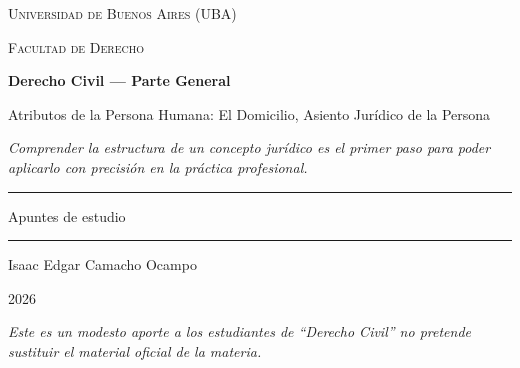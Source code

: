 \documentclass[12pt,oneside]{book}
\newcommand{\universidad}{Universidad de Buenos Aires (UBA)}
\newcommand{\facultad}{Facultad de Derecho}
\newcommand{\materia}{Derecho Civil --- Parte General}
\newcommand{\titulo}{Atributos de la Persona Humana: El Domicilio, Asiento Jurídico de la Persona}
\newcommand{\autor}{Isaac Edgar Camacho Ocampo}
\newcommand{\anio}{2026}
\begin{document}
\begin{titlepage}

\thispagestyle{empty}

\begin{center}

\vspace*{1cm}

{\large \textsc{\universidad}}

\vspace{0.2cm}

{\large \textsc{\facultad}}

\vspace{3cm}

{\Huge \textbf{\materia}}

\vspace{1cm}

{\LARGE \titulo}

\vspace{0.8cm}

\textit{Comprender la estructura de un concepto jurídico es el primer paso para poder aplicarlo con precisión en la práctica profesional.}

\vspace{1.2cm}

\rule{0.70\textwidth}{0.5pt}

\vspace{0.5cm}

{\large Apuntes de estudio}

\vspace{0.5cm}

\rule{0.70\textwidth}{0.5pt}

\vfill

{\large \autor}

\vspace{0.3cm}

{\large \anio}

\end{center}

\vfill

\begin{flushleft}
\textit{Este es un modesto aporte a los estudiantes de ``Derecho Civil'' no pretende sustituir el material oficial de la materia.}
\end{flushleft}

\end{titlepage}

\tableofcontents
\end{document}
